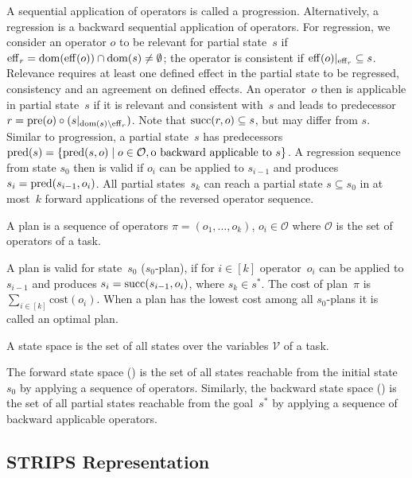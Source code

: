 A sequential application of operators is called a progression. Alternatively, a regression is a backward sequential application of operators. For regression, we consider an operator $o$ to be relevant for partial state~$s$ if $\operatorname{eff}_r=\operatorname{dom}(\operatorname{eff}(o))\cap\operatorname{dom}(s)\neq\emptyset$; the operator is consistent if $\operatorname{eff}(o)|_{\operatorname{eff}_r} \subseteq s$. Relevance requires at least one defined effect in the partial state to be regressed, consistency and an agreement on defined effects. An operator~$o$ then is  applicable in partial state~$s$ if it is relevant and consistent with~$s$ and leads to predecessor $r=\operatorname{pre}(o)\circ (s|_{\operatorname{dom}(s)\setminus\operatorname{eff}_r})$. Note that $\operatorname{succ}(r,o)\subseteq s$, but may differ from $s$. Similar to progression, a partial state~$s$ has predecessors $\operatorname{pred}(s)=\{\operatorname{pred}(s,o)\mid o\in \mathcal{O}, \text{o backward applicable to }s\}$. A regression sequence from state $s_0$ then is valid if $o_i$ can be applied to $s_{i-1}$ and produces $s_i=\operatorname{pred}(s_{i-1},o_i)$. All partial states~$s_k$ can reach a partial state $s\subseteq s_0$ in at most~$k$ forward applications of the reversed operator sequence.

\begin{definition}[Plan]\label{def:plan}
    A plan is a sequence of operators $\pi=(o_1,\ldots,o_k)$, $o_i\in \mathcal{O}$ where $\mathcal{O}$ is the set of operators of a task.
\end{definition}

A plan is valid for state~$s_0$ ($s_0$-plan), if for $i\in[k]$ operator~$o_i$ can be applied to $s_{i-1}$ and produces $s_i=\operatorname{succ}(s_{i-1},o_i)$, where $s_k \in s^*$. The cost of plan~$\pi$ is $\sum_{i\in[k]} \text{cost}(o_i)$. When a plan has the lowest cost among all $s_0$-plans it is called an optimal plan.

\begin{definition}\label{def:statespace}
    A state space is the set of all states over the variables $\mathcal{V}$ of a task.
\end{definition}

The forward state space (\fssp) is the set of all states reachable from the initial state~$s_0$ by applying a sequence of operators. Similarly, the backward state space (\bssp) is the set of all partial states reachable from the goal~$s^*$ by applying a sequence of backward applicable operators.

\subsection{STRIPS Representation}
\label{sec:background_strips}

